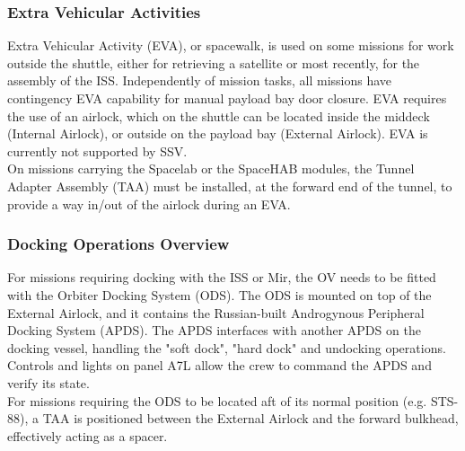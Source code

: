 \documentclass[Space_Shuttle_Vessel_Manual.tex]{subfiles}
\begin{document}
\begin{multicols*}{2}
\subsubsection{Extra Vehicular Activities}
Extra Vehicular Activity (EVA), or spacewalk, is used on some missions for work outside the shuttle, either for retrieving a satellite or most recently, for the assembly of the ISS. Independently of mission tasks, all missions have contingency EVA capability for manual payload bay door closure. EVA requires the use of an airlock, which on the shuttle can be located inside the middeck (Internal Airlock), or outside on the payload bay (External Airlock). EVA is currently not supported by SSV.\\
On missions carrying the Spacelab or the SpaceHAB modules, the Tunnel Adapter Assembly (TAA) must be installed, at the forward end of the tunnel, to provide a way in/out of the airlock during an EVA.


\subsubsection{Docking Operations Overview}
For missions requiring docking with the ISS or Mir, the OV needs to be fitted with the Orbiter Docking System (ODS). The ODS is mounted on top of the External Airlock, and it contains the Russian-built Androgynous Peripheral Docking System (APDS). The APDS interfaces with another APDS on the docking vessel, handling the "soft dock", "hard dock" and undocking operations. Controls and lights on panel A7L allow the crew to command the APDS and verify its state.\\
For missions requiring the ODS to be located aft of its normal position (e.g. STS-88), a TAA is positioned between the External Airlock and the forward bulkhead, effectively acting as a spacer.



\end{multicols*}
\end{document}
